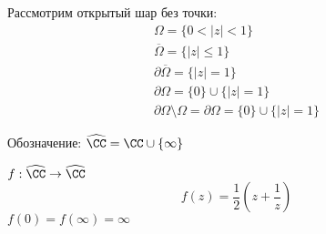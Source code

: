 \begin{exmpl}
    Рассмотрим открытый шар без точки:
    \begin{align*}
        \Omega = \{0 < |z| < 1\} \\ 
        \overline{\Omega} = \{|z| \leq 1\} \\ 
        \partial \overline{\Omega} = \{|z| = 1\} \\ 
        \partial \Omega = \{0\} \cup \{|z| = 1\} \\ 
        \partial \Omega \setminus \Omega = \partial \Omega = \{0\} \cup \{|z| = 1\}
    \end{align*}
\end{exmpl}
\begin{remrk}
    Обозначение: $\widehat{\CC} = \CC \cup \{\infty\}$
\end{remrk}
\begin{df} 
    $f: \widehat{\CC} \to \widehat{\CC}$
    $$f(z) = \frac{1}{2}\left( z + \frac{1}{z} \right)$$
    $f(0) = f(\infty) = \infty$
\end{df}
